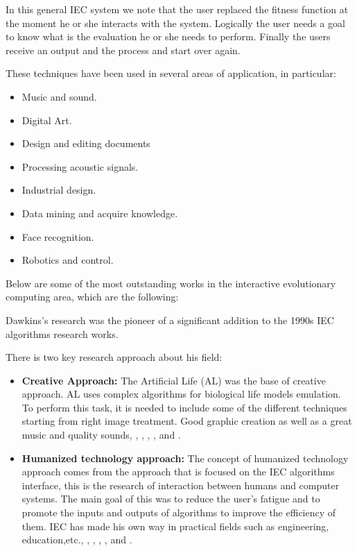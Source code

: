 In this general IEC system we note that the user replaced the fitness function
at the moment he or she interacts with the system. Logically the user needs a
goal to know what is the evaluation he or she needs to perform. Finally the
users receive an output and the process and start over again.

These techniques have been used in several areas of application, in particular:
\begin{itemize}
	\item Music and sound.
	\item Digital Art.
	\item Design and editing documents
	\item Processing acoustic signals.
	\item Industrial design.
	\item Data mining and acquire knowledge.
	\item Face recognition.
	\item Robotics and control.
\end{itemize}

Below are some of the most outstanding works in the interactive evolutionary
computing area, which are the following:


Dawkins's research was the pioneer of a significant addition to the
1990s IEC algorithms research works\cite{dawkins1986blind}.

There is two key research approach about his field:

\begin{itemize}
	\item \textbf{Creative Approach:} The Artificial Life (AL) was the base of
	creative approach. AL uses complex algorithms for biological life models
	emulation. To perform this task, it is needed to include some of the different
	techniques starting from right image treatment. Good graphic creation as well
	as a great music and
	quality sounds, \cite{sims1991artificial}, \cite{sims1994evolving},
	\cite{dawkins1986blind}, \cite{disz1997ubiworld},
	\cite{unemi2000sbart}and \cite{unemi2003sbeat3}.
	\item \textbf{Humanized technology approach:} The concept of humanized
technology approach comes from the approach that is focused on the IEC
algorithms interface, this is the research of interaction between humans and
computer systems. The main goal of this was to reduce the user's fatigue and to
promote the inputs and outputs of algorithms to improve the efficiency of them.
IEC has made his own way in practical fields such as engineering,
education,etc.,
	\cite{parmee1993concrete}, \cite{ventrella1994explorations},
	\cite{takagi1996discrete}, \cite{poli1997genetic},
	\cite{parmee1998genetic} and \cite{takagi1998interactive}.
\end{itemize}




